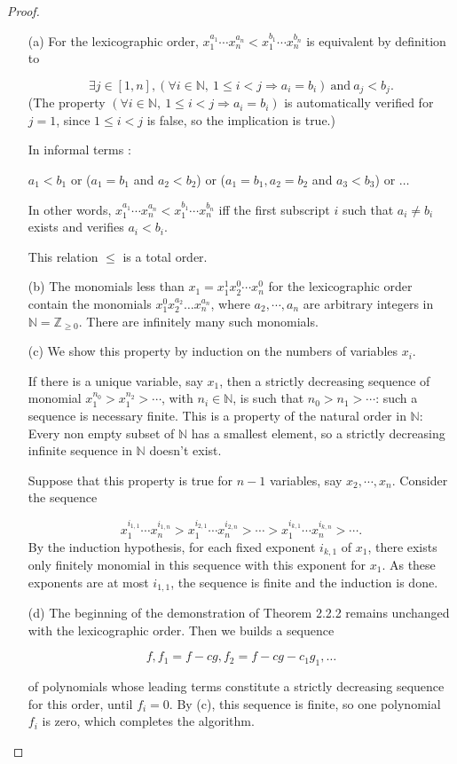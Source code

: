 \documentclass[11pt,a4paper]{article}
\newcommand{\Z}{\mathbb{Z}}
\newcommand{\N}{\mathbb{N}}
\begin{document}
\begin{proof}
\begin{enumerate}
\item[(a)]
For the lexicographic order, $x_1^{a_1}\cdots x_n^{a_n} < x_1^{b_1}\cdots x_n^{b_n}$ is equivalent by definition to

$$\exists j \in [1,n], (\forall i \in \N,\ 1\leq  i< j \Rightarrow a_i = b_i) \ \mathrm{and}\ a_j<b_j.$$
(The property $(\forall i \in \N ,\ 1\leq  i< j \Rightarrow a_i = b_i) $ is automatically verified for  $j=1$, since $1\leq  i< j $ is false, so the implication is true.)

In informal terms :

$a_1<b_1$ or ($a_1=b_1$ and $a_2<b_2$) or ($a_1=b_1,a_2=b_2$ and $a_3<b_3$) or $\ldots$

In other words, $x_1^{a_1}\cdots x_n^{a_n} < x_1^{b_1}\cdots x_n^{b_n}$ iff the first subscript $i$ such that $a_i \neq b_i$ exists and verifies $a_i < b_i$.

This relation $\leq$ is a total order.


\item[(b)]
The monomials less than  $x_1 = x_1^1 x_2^0 \cdots x_n^0$ for the lexicographic order contain the monomials $x_1^0 x_2^{a_2}\ldots x_n^{a_n}$, where $a_2,\cdots, a_n$ are arbitrary integers in $\N = \Z_{\geq 0}$. There are infinitely many such monomials.


\item[(c)]
We show this property by induction on the numbers of variables $x_i$.

If there is a unique variable, say $x_1$, then a strictly decreasing sequence of monomial $x_1^{n_0} > x_1^{n_2} >\cdots$, with $n_i \in \N$,  is such that  $n_0 > n_1 > \cdots$: such a sequence is necessary finite. This is a property of the natural order in $\N$: Every non empty subset of $\N$ has a smallest element, so a strictly decreasing infinite sequence in $\N$ doesn't exist.

Suppose that this property is true for  $n-1$ variables, say $x_2, \cdots,x_n$. Consider the sequence

$$x_1^{i_{1,1}}\cdots x_n^{i_{1,n}}   > x_1^{i_{2,1}}\cdots x_n^{i_{2,n}}  > \cdots >x_1^{i_{k,1}}\cdots x_n^{i_{k,n}} >\cdots .$$
By the induction hypothesis, for each fixed exponent $i_{k,1}$ of  $x_1$, there exists only finitely monomial in this sequence  with this exponent for $x_1$. As these exponents are at most $i_{1,1}$, the sequence is finite and the induction is done.


\item[(d)]
The beginning of the demonstration of Theorem 2.2.2 remains unchanged with the lexicographic order. Then we builds a sequence

$$f,f_1 = f -cg, f_2= f -cg -c_1g_1, \ldots$$

of polynomials whose  leading terms constitute  a strictly decreasing sequence for this order, until $f_i = 0$.  By (c), this sequence is finite, so one polynomial $f_i$ is zero, which completes the algorithm.

\end{enumerate}
\end{proof}
\end{document}
